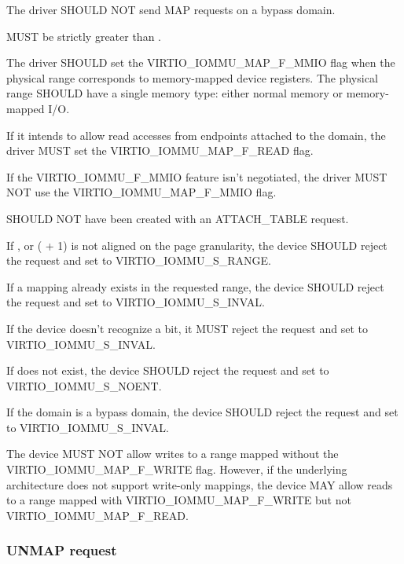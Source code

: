 The driver SHOULD NOT send MAP requests on a bypass domain.

 MUST be strictly greater than .

The driver SHOULD set the VIRTIO_IOMMU_MAP_F_MMIO flag when the physical
range corresponds to memory-mapped device registers. The physical range
SHOULD have a single memory type: either normal memory or memory-mapped
I/O.

If it intends to allow read accesses from endpoints attached to
the domain, the driver MUST set the VIRTIO_IOMMU_MAP_F_READ flag.

If the VIRTIO_IOMMU_F_MMIO feature isn't negotiated, the driver MUST NOT
use the VIRTIO_IOMMU_MAP_F_MMIO flag.

 SHOULD NOT have been created with an ATTACH_TABLE
request.


If ,  or ( + 1) is
not aligned on the page granularity, the device SHOULD reject the request
and set  to VIRTIO_IOMMU_S_RANGE.

If a mapping already exists in the requested range, the device SHOULD
reject the request and set  to VIRTIO_IOMMU_S_INVAL.

If the device doesn't recognize a  bit, it MUST reject the
request and set  to VIRTIO_IOMMU_S_INVAL.

If  does not exist, the device SHOULD reject the request and
set  to VIRTIO_IOMMU_S_NOENT.

If the domain is a bypass domain, the device SHOULD reject the
request and set  to VIRTIO_IOMMU_S_INVAL.

The device MUST NOT allow writes to a range mapped without the
VIRTIO_IOMMU_MAP_F_WRITE flag. However, if the underlying architecture
does not support write-only mappings, the device MAY allow reads to a
range mapped with VIRTIO_IOMMU_MAP_F_WRITE but not
VIRTIO_IOMMU_MAP_F_READ.

\subsubsection{UNMAP request}\label{sec:Device Types / IOMMU Device / Device operations / UNMAP request}

